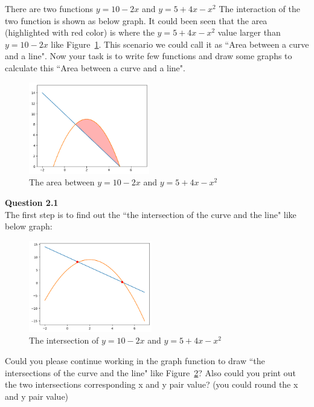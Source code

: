 \documentclass[a4paper]{article}
\begin{document}
    \begin{answer}
    
    There are two functions  $y=10-2x$  and  $y=5+4x-x^{2}$ The interaction of the two function is shown as below graph. It could been seen that the area (highlighted with red color) is where the  $y=5+4x-x^{2}$ value larger than  $y=10-2x$ like Figure~\ref{fig:2.1q}. This scenario we could call it as ``Area between a curve and a line". Now your task is to write few functions and draw some graphs to calculate this ``Area between a curve and a line". \\
    \begin{figure}[H]
        \centering
        \includegraphics[height=4cm,keepaspectratio]{figure/2.1q.png}
        \caption{The area between $y=10-2x$  and  $y=5+4x-x^{2}$}
        \label{fig:2.1q}
    \end{figure}
    
    
    \textbf{Question 2.1} \\
    The first step is to find out the ``the intersection of the curve and the line" like below graph:
    \begin{figure}[H]
        \centering
        \includegraphics[height=4cm,keepaspectratio]{figure/2.11q.png}
        \caption{The intersection of $y=10-2x$  and  $y=5+4x-x^{2}$}
        \label{fig:2.11q}
    \end{figure}

    Could you please continue working in the graph function to draw ``the intersections of the curve and the line" like Figure~\ref{fig:2.11q}? Also could you print out the two intersections corresponding x and y pair value? 
    (you could round the x and y pair value)


\end{answer}
\end{document}
